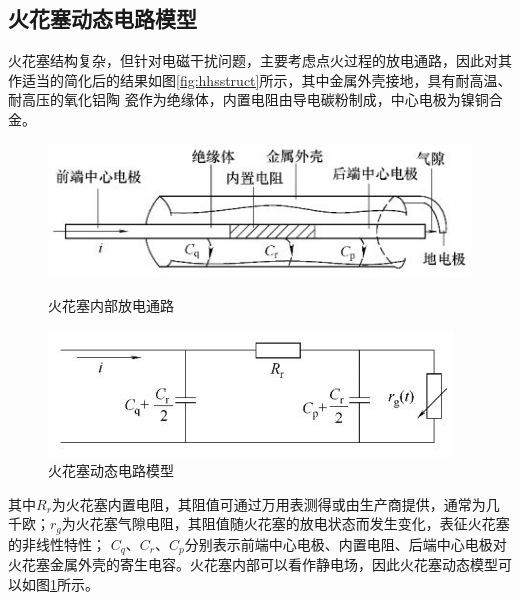 \subsection{火花塞动态电路模型}
火花塞结构复杂，但针对电磁干扰问题，主要考虑点火过程的放电通路，因此对其作适当的简化后的结果如图\ref{fig:hhsstruct}所示，其中金属外壳接地，具有耐高温、耐高压的氧化铝陶
瓷作为绝缘体，内置电阻由导电碳粉制成，中心电极为镍铜合金\cite{zyl2011}。
\begin{figure}[!h]
\centering
	\begin{minipage}[b]{0.5\textwidth}
		\includegraphics[width=\textwidth]{thesis_figure/anecdote_struct}
		\caption{火花塞内部放电通路}
		\label{fig:hhsstruct}
	\end{minipage}

	\begin{minipage}[b]{0.5\textwidth}
		\includegraphics[width=\textwidth]{thesis_figure/anecdote_circuit}
		\caption{火花塞动态电路模型}
		\label{fig:hhscircuit}
	\end{minipage}
\end{figure}
其中$R_{r}$为火花塞内置电阻，其阻值可通过万用表测得或由生产商提供，通常为几千欧；$r_{g}$为火花塞气隙电阻，其阻值随火花塞的放电状态而发生变化，表征火花塞的非线性特性；
$C_{q}$、$C_{r}$、$C_{p}$分别表示前端中心电极、内置电阻、后端中心电极对火花塞金属外壳的寄生电容。火花塞内部可以看作静电场，因此火花塞动态模型可以如图\ref{fig:hhscircuit}所示。\
